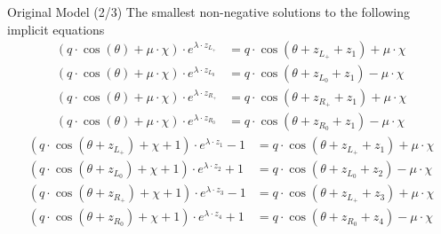 \begin{frame}{Original Model (2/3)}
    The smallest non-negative solutions to the following implicit equations
    \begin{subequations}
        \begin{align}
            (q \cdot \cos(\theta) + \mu \cdot \chi) \cdot e^{\lambda \cdot z_{L_+}}
             & = q \cdot \cos(\theta + z_{L_+} + z_1) + \mu \cdot \chi \\
            (q \cdot \cos(\theta) + \mu \cdot \chi) \cdot e^{\lambda \cdot z_{L_0}}
             & = q \cdot \cos(\theta + z_{L_0} + z_1) - \mu \cdot \chi \\
            (q \cdot \cos(\theta) + \mu \cdot \chi) \cdot e^{\lambda \cdot z_{R_+}}
             & = q \cdot \cos(\theta + z_{R_+} + z_1) + \mu \cdot \chi \\
            (q \cdot \cos(\theta) + \mu \cdot \chi) \cdot e^{\lambda \cdot z_{R_0}}
             & = q \cdot \cos(\theta + z_{R_0} + z_1) - \mu \cdot \chi
        \end{align}
    \end{subequations}
    \vspace{-2em}
    \begin{subequations}
        \begin{align}
            (q \cdot \cos(\theta + z_{L_+}) + \chi + 1) \cdot e^{\lambda \cdot z_1} - 1
             & = q \cdot  \cos(\theta + z_{L_+} + z_1) + \mu \cdot \chi \\
            (q \cdot \cos(\theta + z_{L_0}) + \chi + 1) \cdot e^{\lambda \cdot z_2} + 1
             & = q \cdot  \cos(\theta + z_{L_0} + z_2) - \mu \cdot \chi \\
            (q \cdot \cos(\theta + z_{R_+}) + \chi + 1) \cdot e^{\lambda \cdot z_3} - 1
             & = q \cdot  \cos(\theta + z_{L_+} + z_3) + \mu \cdot \chi \\
            (q \cdot \cos(\theta + z_{R_0}) + \chi + 1) \cdot e^{\lambda \cdot z_4} + 1
             & = q \cdot  \cos(\theta + z_{R_0} + z_4) - \mu \cdot \chi
        \end{align}
    \end{subequations}
\end{frame}

